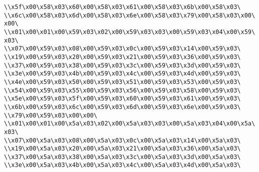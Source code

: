 \verb|\\x5f\x00\x58\x03\x60\x00\x58\x03\x61\x00\x58\x03\x6b\x00\x58\x03\|\newline
\verb|\\x6c\x00\x58\x03\x6d\x00\x58\x03\x6e\x00\x58\x03\x79\x00\x58\x03\x00\x00\|\newline
\verb|\\x01\x00\x01\x00\x59\x03\x02\x00\x59\x03\x03\x00\x59\x03\x04\x00\x59\x03\|\newline
\verb|\\x07\x00\x59\x03\x08\x00\x59\x03\x0c\x00\x59\x03\x14\x00\x59\x03\|\newline
\verb|\\x19\x00\x59\x03\x20\x00\x59\x03\x21\x00\x59\x03\x36\x00\x59\x03\|\newline
\verb|\\x37\x00\x59\x03\x38\x00\x59\x03\x3c\x00\x59\x03\x3d\x00\x59\x03\|\newline
\verb|\\x3e\x00\x59\x03\x4b\x00\x59\x03\x4c\x00\x59\x03\x4d\x00\x59\x03\|\newline
\verb|\\x4e\x00\x59\x03\x50\x00\x59\x03\x51\x00\x59\x03\x53\x00\x59\x03\|\newline
\verb|\\x54\x00\x59\x03\x55\x00\x59\x03\x56\x00\x59\x03\x58\x00\x59\x03\|\newline
\verb|\\x5e\x00\x59\x03\x5f\x00\x59\x03\x60\x00\x59\x03\x61\x00\x59\x03\|\newline
\verb|\\x6b\x00\x59\x03\x6c\x00\x59\x03\x6d\x00\x59\x03\x6e\x00\x59\x03\|\newline
\verb|\\x79\x00\x59\x03\x00\x00\|\newline
\verb|\\x01\x00\x01\x00\x5a\x03\x02\x00\x5a\x03\x03\x00\x5a\x03\x04\x00\x5a\x03\|\newline
\verb|\\x07\x00\x5a\x03\x08\x00\x5a\x03\x0c\x00\x5a\x03\x14\x00\x5a\x03\|\newline
\verb|\\x19\x00\x5a\x03\x20\x00\x5a\x03\x21\x00\x5a\x03\x36\x00\x5a\x03\|\newline
\verb|\\x37\x00\x5a\x03\x38\x00\x5a\x03\x3c\x00\x5a\x03\x3d\x00\x5a\x03\|\newline
\verb|\\x3e\x00\x5a\x03\x4b\x00\x5a\x03\x4c\x00\x5a\x03\x4d\x00\x5a\x03\|\newline

